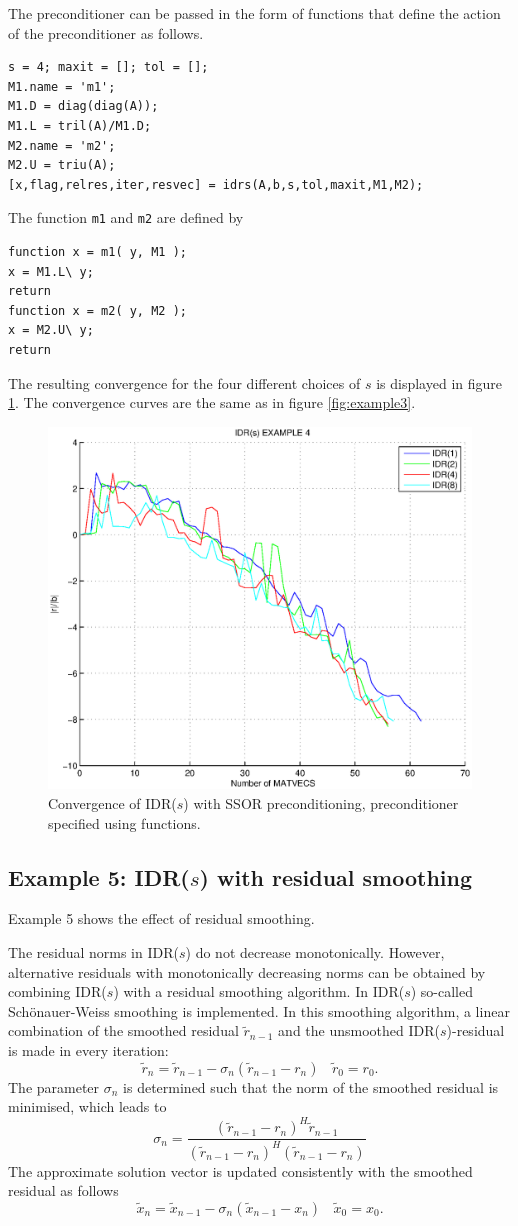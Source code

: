 \documentclass[prodmode,acmtoms]{acmsmall}
\begin{document}
The preconditioner can be passed in the form of functions that define the action of the preconditioner as follows.
\begin{verbatim}
s = 4; maxit = []; tol = [];
M1.name = 'm1';
M1.D = diag(diag(A));
M1.L = tril(A)/M1.D;
M2.name = 'm2';
M2.U = triu(A);
[x,flag,relres,iter,resvec] = idrs(A,b,s,tol,maxit,M1,M2);
\end{verbatim}
The function {\tt m1} and {\tt m2} are defined by
\begin{verbatim}
function x = m1( y, M1 );
x = M1.L\ y;
return
function x = m2( y, M2 );
x = M2.U\ y;
return
\end{verbatim}
The resulting convergence for the four different choices of $s$ is displayed in figure \ref{fig:example4}. The 
convergence curves are the same as in figure \ref{fig:example3}.
\begin{figure}
\centering
\includegraphics[width=.60\linewidth]{example4}
\caption{Convergence of IDR($s$) with SSOR preconditioning, preconditioner specified using functions.}
\label{fig:example4}
\end{figure}
\subsection{Example 5: IDR($s$) with residual smoothing}
Example 5 shows the effect of residual smoothing.

The residual norms in IDR($s$) do not decrease monotonically. However, alternative residuals with monotonically 
decreasing norms can be obtained by combining IDR($s$) with a residual smoothing algorithm. In IDR($s$) 
so-called Sch\"onauer-Weiss smoothing \cite{smoothing,weiss} is implemented. In this smoothing algorithm, 
a linear combination of the smoothed residual $\tilde{r}_{n-1}$ and the unsmoothed IDR($s$)-residual is  made in 
every iteration:
\[
   \tilde{r}_n = \tilde{r}_{n-1} - \sigma_n (\tilde{r}_{n-1} - r_n) ~~~~ \tilde{r}_0 = r_0.
\]
The parameter $\sigma_n$ is determined such that the norm of the smoothed residual is minimised, which leads to
\[
   \sigma_n = \frac{(\tilde{r}_{n-1} - r_n)^H \tilde{r}_{n-1}}{(\tilde{r}_{n-1} - r_n)^H (\tilde{r}_{n-1} - r_n)}
\]
The approximate solution vector is updated consistently with the smoothed residual as follows
\[
    \tilde{x}_n = \tilde{x}_{n-1} - \sigma_n (\tilde{x}_{n-1} - x_n) ~~~~ \tilde{x}_0 = x_0.
\]
\end{document}
